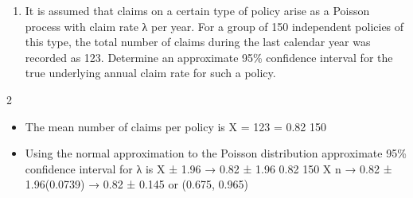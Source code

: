 \documentclass[a4paper,12pt]{article}
\begin{document}
\begin{enumerate}

\item It is assumed that claims on a certain type of policy arise as a Poisson process with
claim rate λ per year.
For a group of 150 independent policies of this type, the total number of claims during
the last calendar year was recorded as 123.
Determine an approximate 95\% confidence interval for the true underlying annual
claim rate for such a policy.

\end{enumerate}
\newpage

2
\begin{itemize}

\item The mean number of claims per policy is X =
123
= 0.82
150
\item Using the normal approximation to the Poisson distribution approximate 95\% confidence interval for λ is X ± 1.96
→ 0.82 ± 1.96
0.82
150
X
n
→ 0.82 ± 1.96(0.0739)
→ 0.82 ± 0.145 or (0.675, 0.965)
\end{itemize}
\end{document}
